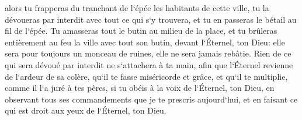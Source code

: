 \verse alors tu frapperas du tranchant de l`épée les habitants de cette ville, tu la dévoueras par interdit avec tout ce qui s`y trouvera, et tu en passeras le bétail au fil de l`épée. 
\verse Tu amasseras tout le butin au milieu de la place, et tu brûleras entièrement au feu la ville avec tout son butin, devant l`Éternel, ton Dieu: elle sera pour toujours un monceau de ruines, elle ne sera jamais rebâtie. 
\verse Rien de ce qui sera dévoué par interdit ne s`attachera à ta main, afin que l`Éternel revienne de l`ardeur de sa colère, qu`il te fasse miséricorde et grâce, et qu`il te multiplie, comme il l`a juré à tes pères, 
\verse si tu obéis à la voix de l`Éternel, ton Dieu, en observant tous ses commandements que je te prescris aujourd`hui, et en faisant ce qui est droit aux yeux de l`Éternel, ton Dieu. 

\chapter{}

